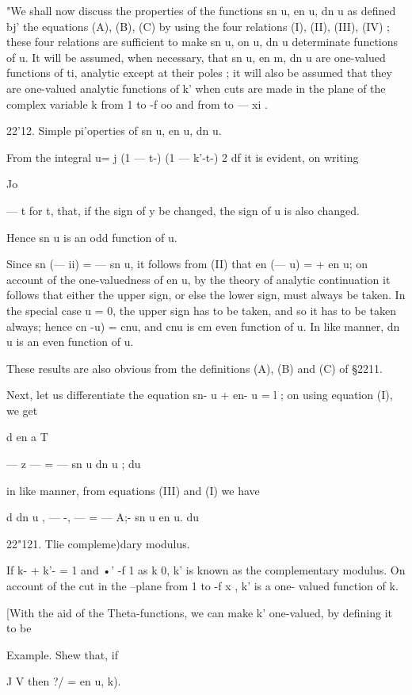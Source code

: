 "We shall now discuss the properties of the functions sn u, en u, dn u
as defined bj' the equations (A), (B), (C) by using the four relations
(I), (II), (III), (IV) ; these four relations are sufficient to make
sn u, on u, dn u determinate functions of u. It will be assumed, when
necessary, that sn u, en m, dn u are one-valued functions of ti,
analytic except at their poles ; it will also be assumed that they are
one-valued analytic functions of k' when cuts are made in the plane of
the complex variable k from 1 to -f oo and from to — xi .

22'12. Simple pi'operties of sn u, en u, dn u.

From the integral u= j (1 — t-) (1 — k'-t-) 2 df it is evident, on
writing

Jo

— t for t, that, if the sign of y be changed, the sign of u is also
changed.

Hence sn u is an odd function of u.

Since sn (— ii) = — sn u, it follows from (II) that en (— u) = + en u;
on account of the one-valuedness of en u, by the theory of analytic
continuation it follows that either the upper sign, or else the lower
sign, must always be taken. In the special case u = 0, the upper sign
has to be taken, and so it has to be taken always; hence cn -u) = cnu,
and cnu is cm even function of u. In like manner, dn u is an even
function of u.

These results are also obvious from the definitions (A), (B) and (C)
of §2211.

Next, let us differentiate the equation sn- u + en- u = l ; on using
equation (I), we get

d en a T

— z — = — sn u dn u ; du

in like manner, from equations (III) and (I) we have

d dn u , — -, — = — A;- sn u en u. du

22"121. Tlie compleme)dary modulus.

If k- + k'- = 1 and •' -f 1 as k 0, k' is known as the complementary
modulus. On account of the cut in the --plane from 1 to -f x , k' is a
one- valued function of k.

[With the aid of the Theta-functions, we can make k' one-valued, by
defining it to be

Example. Shew that, if

J V then ?/ = en u, k).



